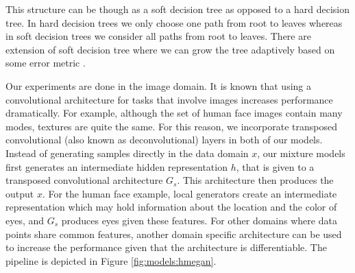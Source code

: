 \documentclass[a4paper,onesided,12pt]{report}
\begin{document}
This structure can be though as a soft decision tree as opposed to a hard decision tree. In hard decision trees we only choose one path from root to leaves whereas in soft decision trees we consider all paths from root to leaves. There are extension of soft decision tree where we can grow the tree adaptively based on some error metric \cite{irsoy2012soft,irsoy2014budding}.

Our experiments are done in the image domain. It is known that using a convolutional architecture for tasks that involve images increases performance dramatically. For example, although the set of human face images contain many modes, textures are quite the same. For this reason, we incorporate transposed convolutional (also known as deconvolutional) layers in both of our models. Instead of generating samples directly in the data domain $x$, our mixture models first generates an intermediate hidden representation $h$, that is given to a transposed convolutional architecture $G_s$. This architecture then produces the output $x$. For the human face example, local generators create an intermediate representation which may hold information about the location and the color of eyes,  and $G_s$ produces eyes given these features. For other domains where data points share common features, another domain specific architecture can be used to increase the performance given that the architecture is differentiable. The pipeline is depicted in Figure \ref{fig:models:hmegan}.
%
%
%

\end{document}
